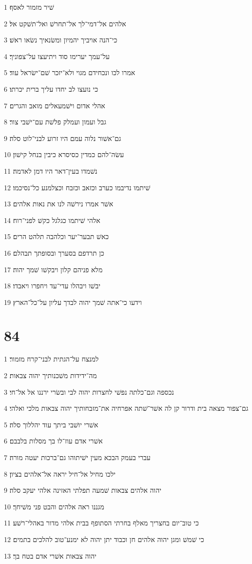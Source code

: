 \par 1 שׁיר מזמור לאסף׃
\par 2 אלהים אל־דמי־לך אל־תחרשׁ ואל־תשׁקט אל׃
\par 3 כי־הנה אויביך יהמיון ומשׂנאיך נשׂאו ראשׁ׃
\par 4 על־עמך יערימו סוד ויתיעצו על־צפוניך׃
\par 5 אמרו לכו ונכחידם מגוי ולא־יזכר שׁם־ישׂראל עוד׃
\par 6 כי נועצו לב יחדו עליך ברית יכרתו׃
\par 7 אהלי אדום וישׁמעאלים מואב והגרים׃
\par 8 גבל ועמון ועמלק פלשׁת עם־ישׁבי צור׃
\par 9 גם־אשׁור נלוה עמם היו זרוע לבני־לוט סלה׃
\par 10 עשׂה־להם כמדין כסיסרא כיבין בנחל קישׁון׃
\par 11 נשׁמדו בעין־דאר היו דמן לאדמה׃
\par 12 שׁיתמו נדיבמו כערב וכזאב וכזבח וכצלמנע כל־נסיכמו׃
\par 13 אשׁר אמרו נירשׁה לנו את נאות אלהים׃
\par 14 אלהי שׁיתמו כגלגל כקשׁ לפני־רוח׃
\par 15 כאשׁ תבער־יער וכלהבה תלהט הרים׃
\par 16 כן תרדפם בסערך ובסופתך תבהלם׃
\par 17 מלא פניהם קלון ויבקשׁו שׁמך יהוה׃
\par 18 יבשׁו ויבהלו עדי־עד ויחפרו ויאבדו׃
\par 19 וידעו כי־אתה שׁמך יהוה לבדך עליון על־כל־הארץ׃

\chapter{84}

\par 1 למנצח על־הגתית לבני־קרח מזמור׃
\par 2 מה־ידידות משׁכנותיך יהוה צבאות׃
\par 3 נכספה וגם־כלתה נפשׁי לחצרות יהוה לבי ובשׂרי ירננו אל אל־חי׃
\par 4 גם־צפור מצאה בית ודרור קן לה אשׁר־שׁתה אפרחיה את־מזבחותיך יהוה צבאות מלכי ואלהי׃
\par 5 אשׁרי יושׁבי ביתך עוד יהללוך סלה׃
\par 6 אשׁרי אדם עוז־לו בך מסלות בלבבם׃
\par 7 עברי בעמק הבכא מעין ישׁיתוהו גם־ברכות יעטה מורה׃
\par 8 ילכו מחיל אל־חיל יראה אל־אלהים בציון׃
\par 9 יהוה אלהים צבאות שׁמעה תפלתי האזינה אלהי יעקב סלה׃
\par 10 מגננו ראה אלהים והבט פני משׁיחך׃
\par 11 כי טוב־יום בחצריך מאלף בחרתי הסתופף בבית אלהי מדור באהלי־רשׁע׃
\par 12 כי שׁמשׁ ומגן יהוה אלהים חן וכבוד יתן יהוה לא ימנע־טוב להלכים בתמים׃
\par 13 יהוה צבאות אשׁרי אדם בטח בך׃


